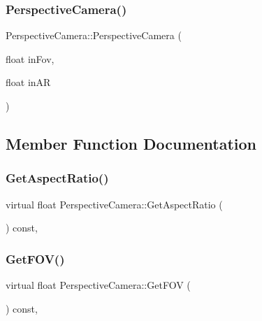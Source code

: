 \subsubsection{\texorpdfstring{Perspective\+Camera()}{PerspectiveCamera()}}
{\footnotesize\ttfamily Perspective\+Camera\+::\+Perspective\+Camera (\begin{DoxyParamCaption}\item[{float}]{in\+Fov,  }\item[{float}]{in\+AR }\end{DoxyParamCaption})}



\subsection{Member Function Documentation}
\hypertarget{class_perspective_camera_a87fb95ff5289f9bb8658c33ed710ec17}{}\label{class_perspective_camera_a87fb95ff5289f9bb8658c33ed710ec17} 
\subsubsection{\texorpdfstring{Get\+Aspect\+Ratio()}{GetAspectRatio()}}
{\footnotesize\ttfamily virtual float Perspective\+Camera\+::\+Get\+Aspect\+Ratio (\begin{DoxyParamCaption}{ }\end{DoxyParamCaption}) const\hspace{0.3cm}{\ttfamily [inline]}, {\ttfamily [virtual]}}

\hypertarget{class_perspective_camera_a04749345688970ec94fb26817bab10be}{}\label{class_perspective_camera_a04749345688970ec94fb26817bab10be} 
\subsubsection{\texorpdfstring{Get\+F\+O\+V()}{GetFOV()}}
{\footnotesize\ttfamily virtual float Perspective\+Camera\+::\+Get\+F\+OV (\begin{DoxyParamCaption}{ }\end{DoxyParamCaption}) const\hspace{0.3cm}{\ttfamily [inline]}, {\ttfamily [virtual]}}



